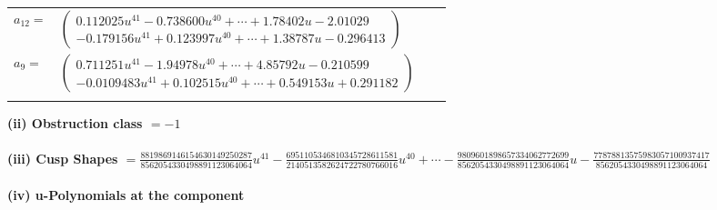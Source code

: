 \documentclass[1p]{elsarticle_modified}
\theoremstyle{definition}
\begin{document}
\begin{tabular}{m{7pt} m{180pt} m{7pt} m{180pt} }
\flushright $a_{12}=$&$\begin{pmatrix}0.112025 u^{41}-0.738600 u^{40}+\cdots+1.78402 u-2.01029\\-0.179156 u^{41}+0.123997 u^{40}+\cdots+1.38787 u-0.296413\end{pmatrix}$ \\
\flushright $a_{9}=$&$\begin{pmatrix}0.711251 u^{41}-1.94978 u^{40}+\cdots+4.85792 u-0.210599\\-0.0109483 u^{41}+0.102515 u^{40}+\cdots+0.549153 u+0.291182\end{pmatrix}$\\&\end{tabular}
\flushleft \textbf{(ii) Obstruction class $= -1$}\\~\\
\flushleft \textbf{(iii) Cusp Shapes $= \frac{8819869146154630149250287}{8562054330498891123064064} u^{41}-\frac{6951105346810345728611581}{2140513582624722780766016} u^{40}+\cdots-\frac{9809601898657334062772699}{8562054330498891123064064} u-\frac{77878813575983057100937417}{8562054330498891123064064}$}\\~\\
\newpage\renewcommand{\arraystretch}{1}
\flushleft \textbf{(iv) u-Polynomials at the component}\newline \\
\end{document}
